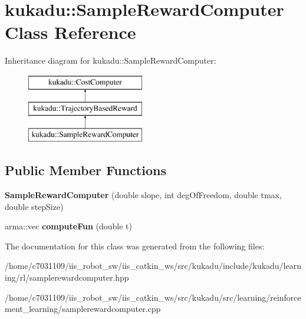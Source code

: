 \hypertarget{classkukadu_1_1SampleRewardComputer}{\section{kukadu\-:\-:Sample\-Reward\-Computer Class Reference}
\label{classkukadu_1_1SampleRewardComputer}
}
Inheritance diagram for kukadu\-:\-:Sample\-Reward\-Computer\-:\begin{figure}[H]
\begin{center}
\leavevmode
\includegraphics[height=3.000000cm]{classkukadu_1_1SampleRewardComputer}
\end{center}
\end{figure}
\subsection*{Public Member Functions}
\begin{DoxyCompactItemize}
\item 
\hypertarget{classkukadu_1_1SampleRewardComputer_a335d5335d0e783f07fb024acc50eec92}{{\bfseries Sample\-Reward\-Computer} (double slope, int deg\-Of\-Freedom, double tmax, double step\-Size)}\label{classkukadu_1_1SampleRewardComputer_a335d5335d0e783f07fb024acc50eec92}

\item 
\hypertarget{classkukadu_1_1SampleRewardComputer_ad68ea48b817bf04485fe3fb13a4007e0}{arma\-::vec {\bfseries compute\-Fun} (double t)}\label{classkukadu_1_1SampleRewardComputer_ad68ea48b817bf04485fe3fb13a4007e0}

\end{DoxyCompactItemize}


The documentation for this class was generated from the following files\-:\begin{DoxyCompactItemize}
\item 
/home/c7031109/iis\-\_\-robot\-\_\-sw/iis\-\_\-catkin\-\_\-ws/src/kukadu/include/kukadu/learning/rl/samplerewardcomputer.\-hpp\item 
/home/c7031109/iis\-\_\-robot\-\_\-sw/iis\-\_\-catkin\-\_\-ws/src/kukadu/src/learning/reinforcement\-\_\-learning/samplerewardcomputer.\-cpp\end{DoxyCompactItemize}
